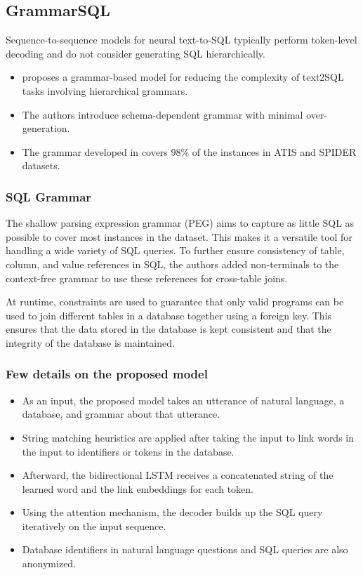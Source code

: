 \subsection{GrammarSQL}

Sequence-to-sequence models for neural text-to-SQL typically perform token-level decoding and do not consider generating SQL hierarchically.

\begin{itemize}
    \item \cite{xu_sqlnet_2017} proposes a grammar-based model for reducing the complexity of text2SQL tasks involving hierarchical grammars.
    \item The authors introduce schema-dependent grammar with minimal over-generation.
    \item The grammar developed in \cite{xu_sqlnet_2017} covers 98\% of the instances in ATIS and SPIDER datasets.
\end{itemize}

\subsubsection*{SQL Grammar}

The shallow parsing expression grammar (PEG) aims to capture as little SQL as possible to cover most instances in the dataset. This makes it a versatile tool for handling a wide variety of SQL queries. To further ensure consistency of table, column, and value references in SQL, the authors added non-terminals to the context-free grammar to use these references for cross-table joins.

At runtime, constraints are used to guarantee that only valid programs can be used to join different tables in a database together using a foreign key. This ensures that the data stored in the database is kept consistent and that the integrity of the database is maintained.

\subsubsection*{Few details on the proposed model}

\begin{itemize}
    \item As an input, the proposed model takes an utterance of natural language, a database, and grammar about that utterance.
    \item String matching heuristics are applied after taking the input to link words in the input to identifiers or tokens in the database.
    \item Afterward, the bidirectional LSTM receives a concatenated string of the learned word and the link embeddings for each token.
    \item Using the attention mechanism, the decoder builds up the SQL query iteratively on the input sequence.
    \item Database identifiers in natural language questions and SQL queries are also anonymized.
\end{itemize}

